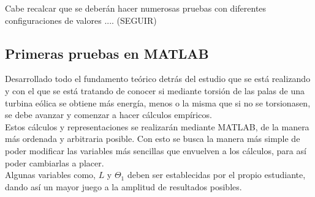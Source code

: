 Cabe recalcar que se deberán hacer numerosas pruebas con diferentes configuraciones de valores .... (SEGUIR)
 
\subsection{Primeras pruebas en MATLAB}

Desarrollado todo el fundamento teórico detrás del estudio que se está realizando y con el que se está tratando de conocer si mediante torsión de las palas de una turbina eólica se obtiene más energía, menos o la misma que si no se torsionasen, se debe avanzar y comenzar a hacer cálculos empíricos. \\

Estos cálculos y representaciones se realizarán mediante MATLAB, de la manera más ordenada y arbitraria posible. Con esto se busca la manera más simple de poder modificar las variables más sencillas que envuelven a los cálculos, para así poder cambiarlas a placer. \\

Algunas variables como, $L$ y $\Theta_1$ deben ser establecidas por el propio estudiante, dando así un mayor juego a la amplitud de resultados posibles. \\